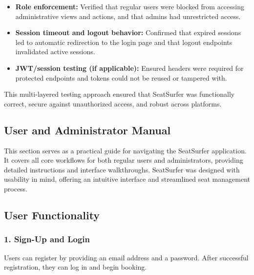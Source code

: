 \documentclass[12pt,a4paper]{report} %
\begin{document}
\begin{itemize}
    \item \textbf{Role enforcement:} Verified that regular users were blocked from accessing administrative views and actions, and that admins had unrestricted access.
    \item \textbf{Session timeout and logout behavior:} Confirmed that expired sessions led to automatic redirection to the login page and that logout endpoints invalidated active sessions.
    \item \textbf{JWT/session testing (if applicable):} Ensured headers were required for protected endpoints and tokens could not be reused or tampered with.
\end{itemize}

This multi-layered testing approach ensured that SeatSurfer was functionally correct, secure against unauthorized access, and robust across platforms.

\subsection{User and Administrator Manual}

This section serves as a practical guide for navigating the SeatSurfer application. It covers all core workflows for both regular users and administrators, providing detailed instructions and interface walkthroughs. SeatSurfer was designed with usability in mind, offering an intuitive interface and streamlined seat management process.

\subsection*{User Functionality}

\subsubsection*{1. Sign-Up and Login}

Users can register by providing an email address and a password. After successful registration, they can log in and begin booking.
\end{document}
